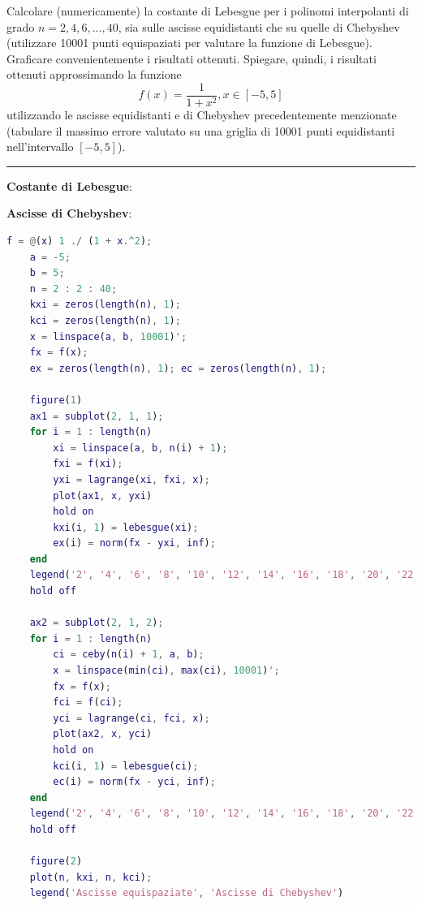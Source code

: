Calcolare (numericamente) la costante di Lebesgue per i polinomi interpolanti di grado $n = 2, 4, 6, ... , 40$, sia sulle ascisse equidistanti che su quelle di Chebyshev (utilizzare 10001 punti equispaziati per valutare la funzione di Lebesgue). Graficare convenientemente i risultati ottenuti. Spiegare, quindi, i risultati ottenuti approssimando la funzione
$$f(x)=\frac{1}{1+x^{2}},x\in[ - 5,5]$$
utilizzando le ascisse equidistanti e di Chebyshev precedentemente menzionate (tabulare il massimo errore valutato su una griglia di 10001 punti equidistanti nell’intervallo $[ - 5,5]$).

\hspace*{\fill}
\par\noindent\rule{\textwidth}{0.4pt}
\hspace*{\fill}

\textbf{Costante di Lebesgue}:

\textbf{Ascisse di Chebyshev}:

\begin{minipage}{\textwidth}
	\begin{lstlisting}[language=Matlab, caption=Codice Matlab]
	f = @(x) 1 ./ (1 + x.^2);
	a = -5;
	b = 5;
	n = 2 : 2 : 40;
	kxi = zeros(length(n), 1);
	kci = zeros(length(n), 1);
	x = linspace(a, b, 10001)';
	fx = f(x);
	ex = zeros(length(n), 1); ec = zeros(length(n), 1);

	figure(1)
	ax1 = subplot(2, 1, 1);
	for i = 1 : length(n)
		xi = linspace(a, b, n(i) + 1);
		fxi = f(xi);
		yxi = lagrange(xi, fxi, x);
		plot(ax1, x, yxi)
		hold on
		kxi(i, 1) = lebesgue(xi);
		ex(i) = norm(fx - yxi, inf);
	end
	legend('2', '4', '6', '8', '10', '12', '14', '16', '18', '20', '22', '24', '26', '28', '30', '32', '34', '36', '38', '40')
	hold off

	ax2 = subplot(2, 1, 2);
	for i = 1 : length(n)
		ci = ceby(n(i) + 1, a, b);
		x = linspace(min(ci), max(ci), 10001)';
		fx = f(x);
		fci = f(ci);
		yci = lagrange(ci, fci, x);
		plot(ax2, x, yci)
		hold on
		kci(i, 1) = lebesgue(ci);
		ec(i) = norm(fx - yci, inf);
	end
	legend('2', '4', '6', '8', '10', '12', '14', '16', '18', '20', '22', '24', '26', '28', '30', '32', '34', '36', '38', '40')
	hold off

	figure(2)
	plot(n, kxi, n, kci);
	legend('Ascisse equispaziate', 'Ascisse di Chebyshev')
	\end{lstlisting}
\end{minipage}

